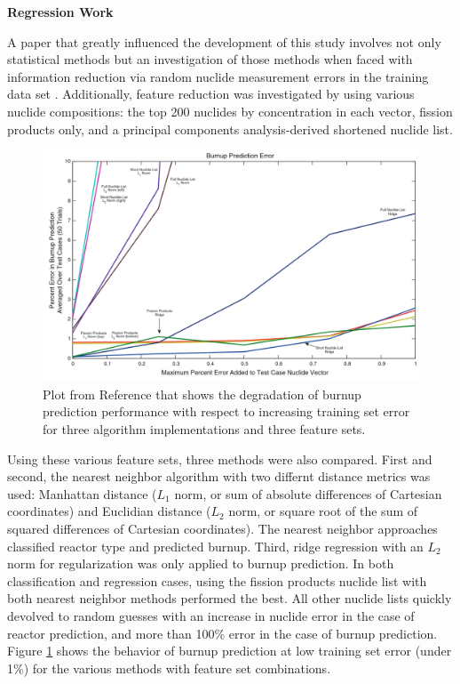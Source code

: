 \noindent \textbf{Regression Work}

A paper that greatly influenced the development of this study involves not only
statistical methods but an investigation of those methods when faced with
information reduction via random nuclide measurement errors in the training
data set \cite{dayman_feasibility_2013}.  Additionally, feature reduction was
investigated by using various nuclide compositions: the top 200 nuclides by
concentration in each vector, fission products only, and a principal components
analysis-derived shortened nuclide list.  

\begin{figure}[!htb]
  \centering
  \includegraphics[width=\linewidth]{./chapters/litrev/dayman.png}
  \caption{Plot from Reference \cite{dayman_feasibility_2013} that shows the 
           degradation of burnup prediction performance with respect to 
           increasing training set error for three algorithm implementations 
           and three feature sets.}
  \label{fig:dayman}
\end{figure}

Using these various feature sets, three methods were also compared. First and
second, the nearest neighbor algorithm with two differnt distance metrics was
used: Manhattan distance ($L_1$ norm, or sum of absolute differences of
Cartesian coordinates) and Euclidian distance ($L_2$ norm, or square root of
the sum of squared differences of Cartesian coordinates).  The nearest neighbor
approaches classified reactor type and predicted burnup.  Third, ridge
regression with an $L_2$ norm for regularization was only applied to burnup
prediction.  In both classification and regression cases, using the fission
products nuclide list with both nearest neighbor methods performed the best.
All other nuclide lists quickly devolved to random guesses with an increase in
nuclide error in the case of reactor prediction, and more than 100\% error in
the case of burnup prediction. Figure \ref{fig:dayman} shows the behavior of
burnup prediction at low training set error (under 1\%) for the various methods
with feature set combinations. 

